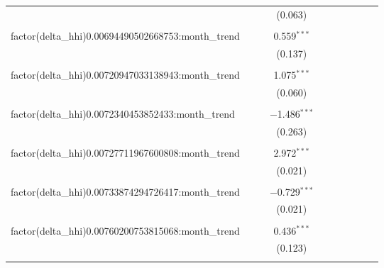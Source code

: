 \begin{table}[H]
{\begin{tabular}{@{\extracolsep{5pt}}lccccccccc}
   &  &  & (0.063) &  &  &  &  &  &  \\  

   & & & & & & & & & \\  

  factor(delta\_hhi)0.00694490502668753:month\_trend &  &  & 0.559$^{***}$ &  &  &  &  &  &  \\  

   &  &  & (0.137) &  &  &  &  &  &  \\  

   & & & & & & & & & \\  

  factor(delta\_hhi)0.00720947033138943:month\_trend &  &  & 1.075$^{***}$ &  &  &  &  &  &  \\  

   &  &  & (0.060) &  &  &  &  &  &  \\  

   & & & & & & & & & \\  

  factor(delta\_hhi)0.0072340453852433:month\_trend &  &  & $-$1.486$^{***}$ &  &  &  &  &  &  \\  

   &  &  & (0.263) &  &  &  &  &  &  \\  

   & & & & & & & & & \\  

  factor(delta\_hhi)0.00727711967600808:month\_trend &  &  & 2.972$^{***}$ &  &  &  &  &  &  \\  

   &  &  & (0.021) &  &  &  &  &  &  \\  

   & & & & & & & & & \\  

  factor(delta\_hhi)0.00733874294726417:month\_trend &  &  & $-$0.729$^{***}$ &  &  &  &  &  &  \\  

   &  &  & (0.021) &  &  &  &  &  &  \\  

   & & & & & & & & & \\  

  factor(delta\_hhi)0.00760200753815068:month\_trend &  &  & 0.436$^{***}$ &  &  &  &  &  &  \\  

   &  &  & (0.123) &  &  &  &  &  &  \\  

   & & & & & & & & & \\  


\end{tabular}}
\end{table}
